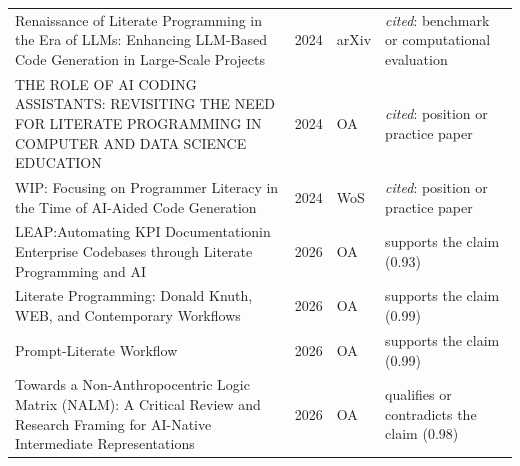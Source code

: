 \begin{longtable}{@{}%
  >{\raggedright\arraybackslash}p{}c%
  >{\raggedright\arraybackslash}p{}%
  >{\raggedright\arraybackslash}p{}@{}}
Renaissance of Literate Programming in the Era of LLMs: Enhancing LLM-Based Code Generation in Large-Scale Projects & 2024 & arXiv & \emph{cited}: benchmark or computational evaluation \\
THE ROLE OF AI CODING ASSISTANTS: REVISITING THE NEED FOR LITERATE PROGRAMMING IN COMPUTER AND DATA SCIENCE EDUCATION & 2024 & OA & \emph{cited}: position or practice paper \\
WIP: Focusing on Programmer Literacy in the Time of AI-Aided Code Generation & 2024 & WoS & \emph{cited}: position or practice paper \\
LEAP:Automating KPI Documentationin Enterprise Codebases through Literate Programming and AI & 2026 & OA & supports the claim (0.93) \\
Literate Programming: Donald Knuth, WEB, and Contemporary Workflows & 2026 & OA & supports the claim (0.99) \\
Prompt-Literate Workflow & 2026 & OA & supports the claim (0.99) \\
Towards a Non-Anthropocentric Logic Matrix (NALM): A Critical Review and Research Framing for AI-Native Intermediate Representations & 2026 & OA & qualifies or contradicts the claim (0.98) \\
\end{longtable}
\endgroup
